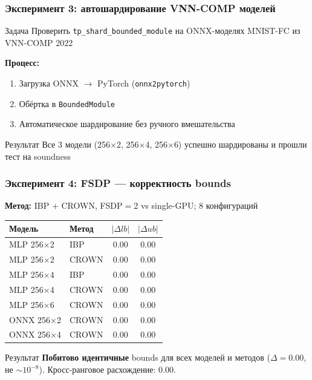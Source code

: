 \begin{frame}
\frametitle{Эксперимент 3: автошардирование VNN-COMP моделей}

\begin{block}{Задача}
Проверить \texttt{tp\_shard\_bounded\_module} на ONNX-моделях MNIST-FC из VNN-COMP 2022
\end{block}

\vspace{0.3cm}

\textbf{Процесс:}
\begin{enumerate}
    \item Загрузка ONNX $\to$ PyTorch (\texttt{onnx2pytorch})
    \item Обёртка в \texttt{BoundedModule}
    \item Автоматическое шардирование без ручного вмешательства
\end{enumerate}

\vspace{0.3cm}

\begin{exampleblock}{Результат}
Все 3 модели (256$\times$2, 256$\times$4, 256$\times$6) успешно шардированы и прошли тест на soundness
\end{exampleblock}

\end{frame}

\begin{frame}
\frametitle{Эксперимент 4: FSDP --- корректность bounds}

\textbf{Метод:} IBP + CROWN, FSDP$=$2 vs single-GPU; 8 конфигураций

\vspace{0.2cm}

\begin{table}[h]
\centering
\scriptsize
\begin{tabular}{llcc}
\hline
\textbf{Модель} & \textbf{Метод} & $|\Delta lb|$ & $|\Delta ub|$ \\
\hline
MLP 256$\times$2 & IBP   & $0.00$ & $0.00$ \\
MLP 256$\times$2 & CROWN & $0.00$ & $0.00$ \\
MLP 256$\times$4 & IBP   & $0.00$ & $0.00$ \\
MLP 256$\times$4 & CROWN & $0.00$ & $0.00$ \\
MLP 256$\times$6 & CROWN & $0.00$ & $0.00$ \\
ONNX 256$\times$2 & CROWN & $0.00$ & $0.00$ \\
ONNX 256$\times$4 & CROWN & $0.00$ & $0.00$ \\
\hline
\end{tabular}
\end{table}

\vspace{0.2cm}

\begin{exampleblock}{Результат}
\textbf{Побитово идентичные} bounds для всех моделей и методов ($\Delta = 0.00$, не $\sim\!10^{-8}$). Кросс-ранговое расхождение: $0.00$.
\end{exampleblock}

\end{frame}

